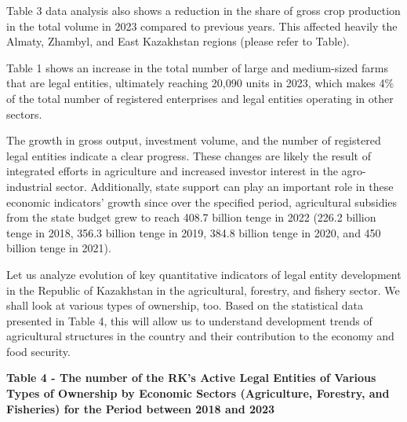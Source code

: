 
Table 3 data analysis also shows a reduction in the share of gross crop
production in the total volume in 2023 compared to previous years. This
affected heavily the Almaty, Zhambyl, and East Kazakhstan regions
(please refer to Table).

Table 1 shows an increase in the total number of large and medium-sized
farms that are legal entities, ultimately reaching 20,090 units in 2023,
which makes 4\% of the total number of registered enterprises and legal
entities operating in other sectors.

The growth in gross output, investment volume, and the number of
registered legal entities indicate a clear progress. These changes are
likely the result of integrated efforts in agriculture and increased
investor interest in the agro-industrial sector. Additionally, state
support can play an important role in these economic indicators' growth
since over the specified period, agricultural subsidies from the state
budget grew to reach 408.7 billion tenge in 2022 (226.2 billion tenge in
2018, 356.3 billion tenge in 2019, 384.8 billion tenge in 2020, and 450
billion tenge in 2021).

Let us analyze evolution of key quantitative indicators of legal entity
development in the Republic of Kazakhstan in the agricultural, forestry,
and fishery sector. We shall look at various types of ownership, too.
Based on the statistical data presented in Table 4, this will allow us
to understand development trends of agricultural structures in the
country and their contribution to the economy and food security.

{\bfseries Table 4 - The number of the RK's Active Legal Entities of
Various Types of Ownership by Economic Sectors (Agriculture, Forestry,
and Fisheries) for the Period between 2018 and 2023}

